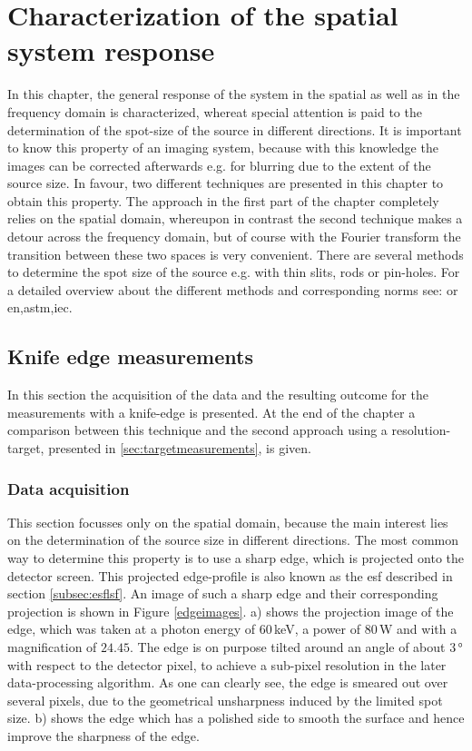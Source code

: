 \chapter[SSR characterization]{Characterization of the spatial system response}\label{chap:sysresp}
In this chapter, the general response of the system in the spatial as well as in the frequency domain is characterized, whereat special attention is paid to the determination of the spot-size of the source in different directions. It is important to know this property of an imaging system, because with this knowledge the images can be corrected afterwards e.g. for blurring due to the extent of the source size. In favour, two different techniques are presented in this chapter to obtain this property. The approach in the first part of the chapter completely relies on the spatial domain, whereupon in contrast the second technique makes a detour across the frequency domain, but of course with the Fourier transform the transition between these two spaces is very convenient. There are several methods to determine the spot size of the source e.g. with thin slits, rods or pin-holes. For a detailed overview about the different methods and corresponding norms see: \citep[see: Bavendiek et. al 2012]{Bavendiek2012} or \acrshort{en},\acrshort{astm},\acrshort{iec}.     
\section{Knife edge measurements}\label{sec:kedgemeasurements}
In this section the acquisition of the data and the resulting outcome for the measurements with a knife-edge is presented. At the end of the chapter a comparison between this technique and the second approach using a resolution-target, presented in \ref{sec:targetmeasurements}, is given. 
\subsection{Data acquisition}\label{subsec:knifedata}
This section focusses only on the spatial domain, because the main interest lies on the determination of the source size in different directions. The most common way to determine this property is to use a sharp edge, which is projected onto the detector screen. This projected edge-profile is also known as the \gls{esf} described in section \ref{subsec:esflsf}.   
An image of such a sharp edge and their corresponding projection is shown in Figure \ref{edgeimages}. a) shows the projection image of the edge, which was taken at a photon energy of $60\,$keV, a power of $80\,$W and with a magnification of $24.45$. The edge is on purpose tilted around an angle of about $3\,$° with respect to the detector pixel, to achieve a sub-pixel resolution in the later data-processing algorithm. As one can clearly see, the edge is smeared out over several pixels, due to the geometrical unsharpness induced by the limited spot size. b) shows the edge which has a polished side to smooth the surface and hence improve the sharpness of the edge.

